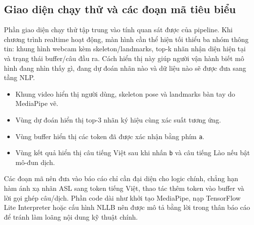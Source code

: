 ﻿\subsection{Giao diện chạy thử và các đoạn mã tiêu biểu}

Phần giao diện chạy thử tập trung vào tính quan sát được của pipeline. Khi chương trình realtime hoạt động, màn hình cần thể hiện tối thiểu ba nhóm thông tin: khung hình webcam kèm skeleton/landmarks, top-k nhãn nhận diện hiện tại và trạng thái buffer/câu đầu ra. Cách hiển thị này giúp người vận hành biết mô hình đang nhìn thấy gì, đang dự đoán nhãn nào và dữ liệu nào sẽ được đưa sang tầng NLP.

\begin{itemize}
    \item Khung video hiển thị người dùng, skeleton pose và landmarks bàn tay do MediaPipe vẽ.
    \item Vùng dự đoán hiển thị top-3 nhãn ký hiệu cùng xác suất tương ứng.
    \item Vùng buffer hiển thị các token đã được xác nhận bằng phím \texttt{a}.
    \item Vùng kết quả hiển thị câu tiếng Việt sau khi nhấn \texttt{b} và câu tiếng Lào nếu bật mô-đun dịch.
\end{itemize}

Các đoạn mã nên đưa vào báo cáo chỉ cần đại diện cho logic chính, chẳng hạn hàm ánh xạ nhãn ASL sang token tiếng Việt, thao tác thêm token vào buffer và lời gọi ghép câu/dịch. Phần code dài như khởi tạo MediaPipe, nạp TensorFlow Lite Interpreter hoặc cấu hình NLLB nên được mô tả bằng lời trong thân báo cáo để tránh làm loãng nội dung kỹ thuật chính.

